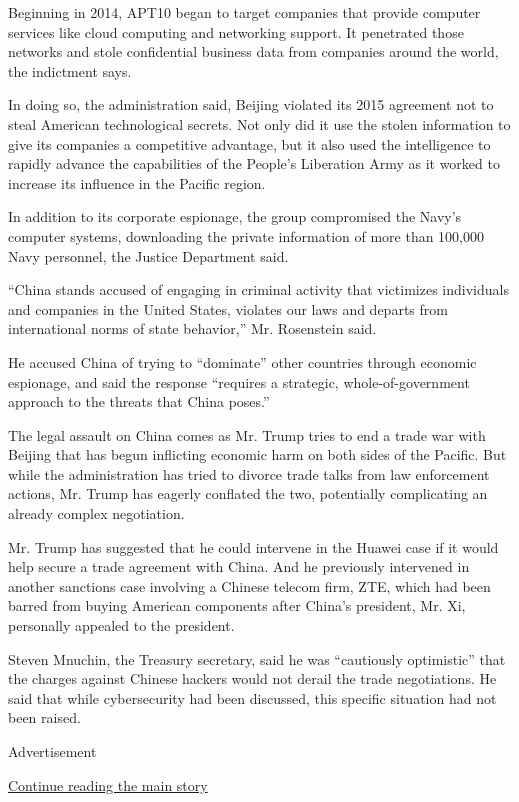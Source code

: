 Beginning in 2014, APT10 began to target companies that provide computer
services like cloud computing and networking support. It penetrated
those networks and stole confidential business data from companies
around the world, the indictment says.

In doing so, the administration said, Beijing violated its 2015
agreement not to steal American technological secrets. Not only did it
use the stolen information to give its companies a competitive
advantage, but it also used the intelligence to rapidly advance the
capabilities of the People's Liberation Army as it worked to increase
its influence in the Pacific region.

In addition to its corporate espionage, the group compromised the Navy's
computer systems, downloading the private information of more than
100,000 Navy personnel, the Justice Department said.

``China stands accused of engaging in criminal activity that victimizes
individuals and companies in the United States, violates our laws and
departs from international norms of state behavior,'' Mr. Rosenstein
said.

He accused China of trying to ``dominate'' other countries through
economic espionage, and said the response ``requires a strategic,
whole-of-government approach to the threats that China poses.''

The legal assault on China comes as Mr. Trump tries to end a trade war
with Beijing that has begun inflicting economic harm on both sides of
the Pacific. But while the administration has tried to divorce trade
talks from law enforcement actions, Mr. Trump has eagerly conflated the
two, potentially complicating an already complex negotiation.

Mr. Trump has suggested that he could intervene in the Huawei case if it
would help secure a trade agreement with China. And he previously
intervened in another sanctions case involving a Chinese telecom firm,
ZTE, which had been barred from buying American components after China's
president, Mr. Xi, personally appealed to the president.

Steven Mnuchin, the Treasury secretary, said he was ``cautiously
optimistic'' that the charges against Chinese hackers would not derail
the trade negotiations. He said that while cybersecurity had been
discussed, this specific situation had not been raised.

Advertisement

\protect\hyperlink{after-bottom}{Continue reading the main story}

